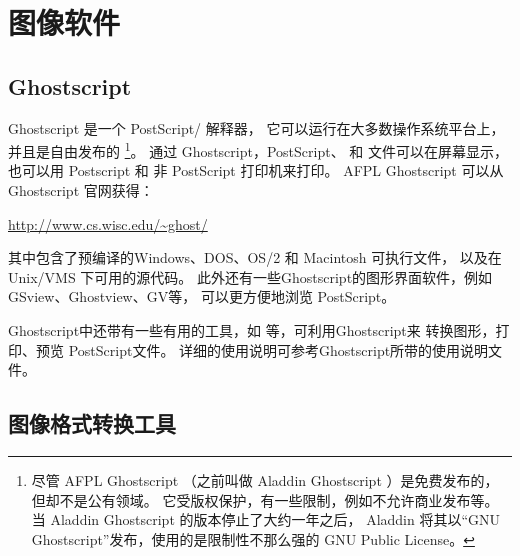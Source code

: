 \section{图像软件}\label{sec:graphicsoftware}

\subsection{Ghostscript}\label{ssec:gs}
Ghostscript 是一个 PostScript/ 解释器，
它可以运行在大多数操作系统平台上，并且是自由发布的
\footnote{
	尽管 AFPL Ghostscript （之前叫做 Aladdin Ghostscript ）是免费发布的，
	但却不是公有领域。
	它受版权保护，有一些限制，例如不允许商业发布等。
	当 Aladdin Ghostscript 的版本停止了大约一年之后，
	Aladdin 将其以“GNU Ghostscript”发布，使用的是限制性不那么强的 GNU Public License。}。
通过 Ghostscript，PostScript、 和  文件可以在屏幕显示，
也可以用 Postscript 和 非 PostScript 打印机来打印。
AFPL Ghostscript 可以从 Ghostscript 官网获得：
\begin{center}
	\url{http://www.cs.wisc.edu/~ghost/}
\end{center}
其中包含了预编译的Windows、DOS、OS/2 和 Macintosh 可执行文件，
以及在 Unix/VMS 下可用的源代码。
此外还有一些Ghostscript的图形界面软件，例如GSview、Ghostview、GV等，
可以更方便地浏览 PostScript。


Ghostscript中还带有一些有用的工具，如  等，可利用Ghostscript来
转换图形，打印、预览 PostScript文件。
详细的使用说明可参考Ghostscript所带的使用说明文件。

\subsection{图像格式转换工具}\label{ssec:convertor}

